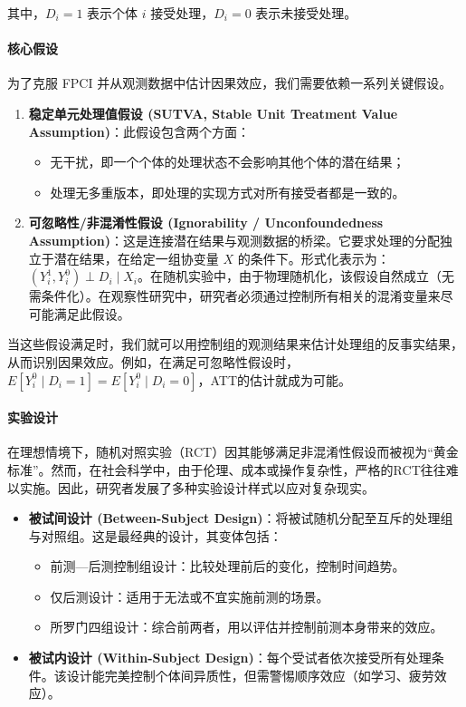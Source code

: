 其中，$D_i=1$ 表示个体 $i$ 接受处理，$D_i=0$ 表示未接受处理。

\paragraph*{核心假设}
为了克服 FPCI 并从观测数据中估计因果效应，我们需要依赖一系列关键假设。

\begin{enumerate}
    \item \textbf{稳定单元处理值假设 (SUTVA, Stable Unit Treatment Value Assumption)}：此假设包含两个方面：
    \begin{itemize}
        \item 无干扰，即一个个体的处理状态不会影响其他个体的潜在结果；
        \item 处理无多重版本，即处理的实现方式对所有接受者都是一致的。
    \end{itemize}
    \item \textbf{可忽略性/非混淆性假设 (Ignorability / Unconfoundedness Assumption)}：这是连接潜在结果与观测数据的桥梁。它要求处理的分配独立于潜在结果，在给定一组协变量 $X$ 的条件下。形式化表示为：$(Y_i^1, Y_i^0) \perp D_i \mid X_i$。在随机实验中，由于物理随机化，该假设自然成立（无需条件化）。在观察性研究中，研究者必须通过控制所有相关的混淆变量来尽可能满足此假设。
\end{enumerate}

当这些假设满足时，我们就可以用控制组的观测结果来估计处理组的反事实结果，从而识别因果效应。例如，在满足可忽略性假设时，$E[Y_i^0 \mid D_i = 1] = E[Y_i^0 \mid D_i = 0]$，ATT的估计就成为可能。

\paragraph*{实验设计}
在理想情境下，随机对照实验（RCT）因其能够满足非混淆性假设而被视为“黄金标准”。然而，在社会科学中，由于伦理、成本或操作复杂性，严格的RCT往往难以实施。因此，研究者发展了多种实验设计样式以应对复杂现实。

\begin{itemize}
    \item \textbf{被试间设计 (Between-Subject Design)}：将被试随机分配至互斥的处理组与对照组。这是最经典的设计，其变体包括：
    \begin{itemize}
        \item 前测—后测控制组设计：比较处理前后的变化，控制时间趋势。
        \item 仅后测设计：适用于无法或不宜实施前测的场景。
        \item 所罗门四组设计：综合前两者，用以评估并控制前测本身带来的效应。
    \end{itemize}
    \item \textbf{被试内设计 (Within-Subject Design)}：每个受试者依次接受所有处理条件。该设计能完美控制个体间异质性，但需警惕顺序效应（如学习、疲劳效应）。
\end{itemize}

